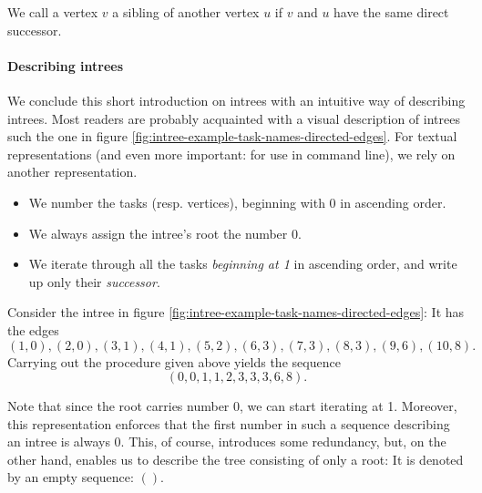 \begin{definition}[Siblings]
  We call a vertex $v$ a sibling of another vertex $u$ if $v$ and $u$ have the same direct successor.
\end{definition}

\paragraph{Describing intrees}

We conclude this short introduction on intrees with an intuitive way of describing intrees. Most readers are probably acquainted with a visual description of intrees such the one in figure \ref{fig:intree-example-task-names-directed-edges}. For textual representations (and even more important: for use in command line), we rely on another representation. 

\begin{itemize}
\item We number the tasks (resp. vertices), beginning with 0 in
  ascending order.
\item We always assign the intree's root the number 0.
\item We iterate through all the tasks \emph{beginning at 1} in ascending order, and write up only their \emph{successor}.
\end{itemize}

Consider the intree in figure \ref{fig:intree-example-task-names-directed-edges}: It has the edges
\begin{equation*}
  (1,0), (2,0), (3,1), (4,1), (5,2), (6,3), (7,3), (8,3), (9,6), (10, 8).
\end{equation*}
Carrying out the procedure given above yields the sequence
\begin{equation*}
  (0, 0, 1, 1, 2, 3, 3, 3, 6, 8).
\end{equation*}

Note that since the root carries number 0, we can start iterating at 1. Moreover, this representation enforces that the first number in such a sequence describing an intree is always 0. This, of course, introduces some redundancy, but, on the other hand, enables us to describe the tree consisting of only a root: It is denoted by an empty sequence: $()$.


